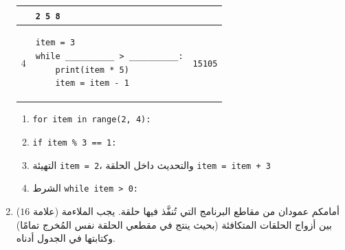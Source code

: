 \documentclass[14pt]{extarticle}
\begin{document}
\begin{enumerate}[label=\textbf{السؤال \arabic*:}, wide=0pt, itemsep=2.2em]
{\begin{longtable}{|C{1.5cm}|p{9cm}|C{4cm}|}
& \textenglish{\texttt{2 5 8}} \\
\hline
$4$ &
\begin{pycell}
\begin{english}
\begin{verbatim}
item = 3
while __________ > __________:
    print(item * 5)
    item = item - 1
\end{verbatim}
\end{english}
\end{pycell}
& \textenglish{\texttt{15}}\newline\textenglish{\texttt{10}}\newline\textenglish{\texttt{5}} \\
\hline
\end{longtable}}

\ifwithsols
\begin{boxSolution}
\begin{enumerate}[label=\arabic*.]
\item \textenglish{\texttt{for item in range(2, 4):}}
\item \textenglish{\texttt{if item \% 3 == 1:}}
\item التهيئة \textenglish{\texttt{item = 2}}، والتحديث داخل الحلقة \textenglish{\texttt{item = item + 3}}
\item الشرط \textenglish{\texttt{while item > 0:}}
\end{enumerate}
\end{boxSolution}
\fi
\filbreak

\item ($16$ علامة) أمامكم عمودان من مقاطع البرنامج التي تُنفَّذ فيها حلقة. يجب الملاءمة بين أزواج الحلقات المتكافئة (بحيث ينتج في مقطعي الحلقة نفس المُخرج تمامًا) وكتابتها في الجدول أدناه.


\end{enumerate}
\end{document}
